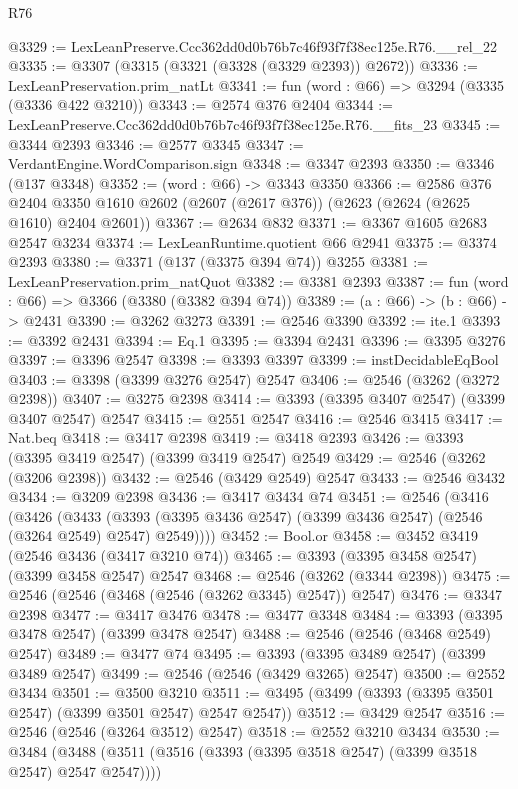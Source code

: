 \begin{lexlean}{R76}
\begin{coremodule}
@3329 := LexLeanPreserve.Ccc362dd0d0b76b7c46f93f7f38ec125e.R76.__rel_22
@3335 := @3307 (@3315 (@3321 (@3328 (@3329 @2393)) @2672))
@3336 := LexLeanPreservation.prim_natLt
@3341 := fun (word : @66) => @3294 (@3335 (@3336 @422 @3210))
@3343 := @2574 @376 @2404
@3344 := LexLeanPreserve.Ccc362dd0d0b76b7c46f93f7f38ec125e.R76.__fits_23
@3345 := @3344 @2393
@3346 := @2577 @3345
@3347 := VerdantEngine.WordComparison.sign
@3348 := @3347 @2393
@3350 := @3346 (@137 @3348)
@3352 := (word : @66) -> @3343 @3350
@3366 := @2586
    @376
    @2404
    @3350
    @1610
    @2602
    (@2607 (@2617 @376))
    (@2623 (@2624 (@2625 @1610) @2404 @2601))
@3367 := @2634 @832
@3371 := @3367 @1605 @2683 @2547 @3234
@3374 := LexLeanRuntime.quotient @66 @2941
@3375 := @3374 @2393
@3380 := @3371 (@137 (@3375 @394 @74)) @3255
@3381 := LexLeanPreservation.prim_natQuot
@3382 := @3381 @2393
@3387 := fun (word : @66) => @3366 (@3380 (@3382 @394 @74))
@3389 := (a : @66) -> (b : @66) -> @2431
@3390 := @3262 @3273
@3391 := @2546 @3390
@3392 := ite.{1}
@3393 := @3392 @2431
@3394 := Eq.{1}
@3395 := @3394 @2431
@3396 := @3395 @3276
@3397 := @3396 @2547
@3398 := @3393 @3397
@3399 := instDecidableEqBool
@3403 := @3398 (@3399 @3276 @2547) @2547
@3406 := @2546 (@3262 (@3272 @2398))
@3407 := @3275 @2398
@3414 := @3393 (@3395 @3407 @2547) (@3399 @3407 @2547) @2547
@3415 := @2551 @2547
@3416 := @2546 @3415
@3417 := Nat.beq
@3418 := @3417 @2398
@3419 := @3418 @2393
@3426 := @3393 (@3395 @3419 @2547) (@3399 @3419 @2547) @2549
@3429 := @2546 (@3262 (@3206 @2398))
@3432 := @2546 (@3429 @2549) @2547
@3433 := @2546 @3432
@3434 := @3209 @2398
@3436 := @3417 @3434 @74
@3451 := @2546
    (@3416
      (@3426
        (@3433 (@3393 (@3395 @3436 @2547) (@3399 @3436 @2547) (@2546 (@3264 @2549) @2547) @2549))))
@3452 := Bool.or
@3458 := @3452 @3419 (@2546 @3436 (@3417 @3210 @74))
@3465 := @3393 (@3395 @3458 @2547) (@3399 @3458 @2547) @2547
@3468 := @2546 (@3262 (@3344 @2398))
@3475 := @2546 (@2546 (@3468 (@2546 (@3262 @3345) @2547)) @2547)
@3476 := @3347 @2398
@3477 := @3417 @3476
@3478 := @3477 @3348
@3484 := @3393 (@3395 @3478 @2547) (@3399 @3478 @2547)
@3488 := @2546 (@2546 (@3468 @2549) @2547)
@3489 := @3477 @74
@3495 := @3393 (@3395 @3489 @2547) (@3399 @3489 @2547)
@3499 := @2546 (@2546 (@3429 @3265) @2547)
@3500 := @2552 @3434
@3501 := @3500 @3210
@3511 := @3495 (@3499 (@3393 (@3395 @3501 @2547) (@3399 @3501 @2547) @2547 @2547))
@3512 := @3429 @2547
@3516 := @2546 (@2546 (@3264 @3512) @2547)
@3518 := @2552 @3210 @3434
@3530 := @3484 (@3488 (@3511 (@3516 (@3393 (@3395 @3518 @2547) (@3399 @3518 @2547) @2547 @2547))))

\end{coremodule}
\end{lexlean}
